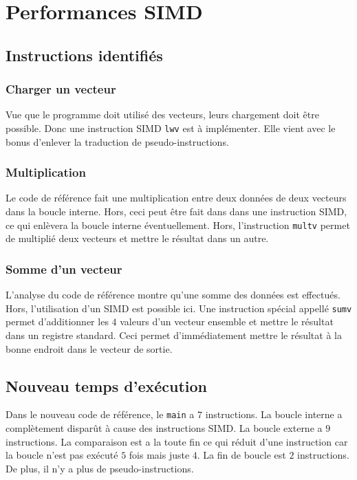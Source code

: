 \documentclass[a11paper]{article}
\begin{document}
\section{Performances SIMD}

\subsection{Instructions identifiés}
\subsubsection{Charger un vecteur}
Vue que le programme doit utilisé des vecteurs, leurs chargement doit être
possible. Donc une instruction SIMD \verb|lwv| est à implémenter. Elle vient
avec le bonus d'enlever la traduction de pseudo-instructions.

\subsubsection{Multiplication}
Le code de référence fait une multiplication entre deux données de deux
vecteurs dans la boucle interne. Hors, ceci peut être fait dans dans une
instruction SIMD, ce qui enlèvera la boucle interne éventuellement. Hors,
l'instruction \verb|multv| permet de multiplié deux vecteurs et mettre le
résultat dans un autre.

\subsubsection{Somme d'un vecteur}
L'analyse du code de référence montre qu'une somme des données est effectués.
Hors, l'utilisation d'un SIMD est possible ici. Une instruction spécial appellé
\verb|sumv| permet d'additionner les $4$ valeurs d'un vecteur ensemble et
mettre le résultat dans un registre standard. Ceci permet d'immédiatement
mettre le résultat à la bonne endroit dans le vecteur de sortie.

\subsection{Nouveau temps d'exécution}
Dans le nouveau code de référence, le \verb|main| a $7$ instructions. La boucle
interne a complètement disparût à cause des instructions SIMD. La boucle
externe a $9$ instructions. La comparaison est a la toute fin ce qui réduit
d'une instruction car la boucle n'est pas exécuté $5$ fois mais juste $4$. La
fin de boucle est $2$ instructions. De plus, il n'y a plus de pseudo-instructions.
\end{document}
